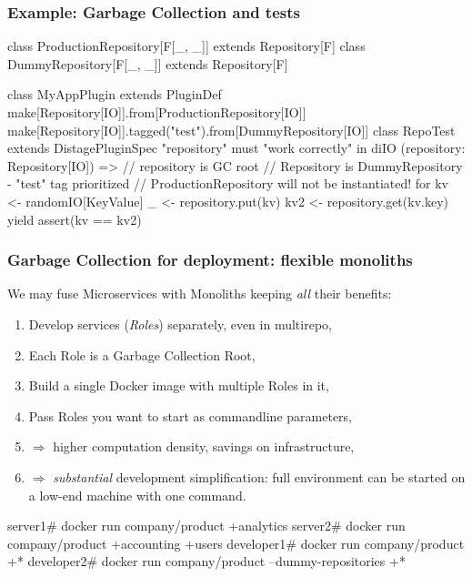 \documentclass[usenames,dvipsnames]{beamer}
\begin{document}
\begin{frame}[fragile]
\frametitle{Example: Garbage Collection and tests}\begin{scalacode}
class ProductionRepository[F[_, _]] extends Repository[F]
class DummyRepository[F[_, _]] extends Repository[F]

class MyAppPlugin extends PluginDef {
  make[Repository[IO]].from[ProductionRepository[IO]]
  make[Repository[IO]].tagged("test").from[DummyRepository[IO]]
}
class RepoTest extends DistagePluginSpec {
  "repository" must {
    "work correctly" in diIO {
      (repository: Repository[IO]) => // repository is GC root
      // Repository is DummyRepository - "test" tag prioritized
      // ProductionRepository will not be instantiated!
      for { kv  <- randomIO[KeyValue]
            _   <- repository.put(kv)
            kv2 <- repository.get(kv.key)
      } yield assert(kv == kv2)
}}}
  \end{scalacode}
\end{frame}

\begin{frame}[fragile]
\frametitle{Garbage Collection for deployment: flexible monoliths}
  We may fuse Microservices with Monoliths keeping \textit{all} their benefits:
  \begin{enumerate}
  \item Develop services (\textit{Roles}\footnotemark[1]) separately, even in multirepo,
  \item Each Role is a Garbage Collection Root,
  \item Build a single Docker image with multiple Roles in it,
  \item Pass Roles you want to start as commandline parameters,
  \item $\Rightarrow$ higher computation density, savings on infrastructure,
  \item $\Rightarrow$ \textit{substantial} development simplification: full environment can be started on a low-end machine with one command.
  \end{enumerate}

  \begin{textcode}
server1# docker run company/product +analytics
server2# docker run company/product +accounting +users
developer1# docker run company/product +*
developer2# docker run company/product --dummy-repositories +*
  \end{textcode}

\end{frame}
\end{document}
